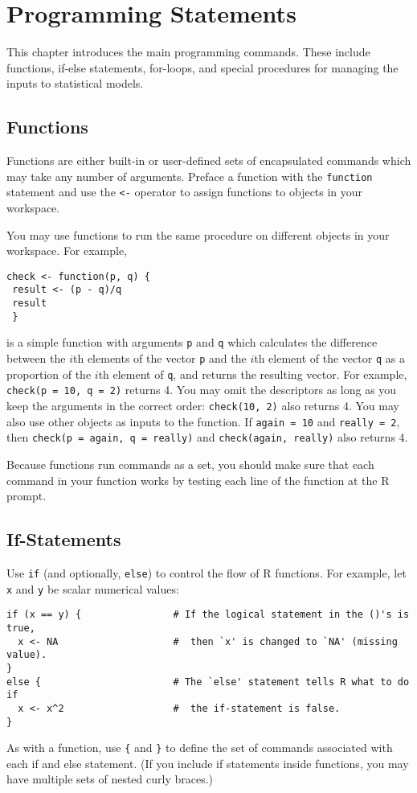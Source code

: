 \chapter{Programming Statements}

This chapter introduces the main programming commands.  These include
functions, if-else statements, for-loops, and special procedures for
managing the inputs to statistical models.  

\section{Functions}

Functions are either built-in or user-defined sets of encapsulated
commands which may take any number of arguments.  Preface a function
with the {\tt function} statement and use the {\tt <-}
operator to assign functions to objects in your workspace.  

You may use functions to run the same procedure on different objects
in your workspace.  For example, 
\begin{verbatim}
check <- function(p, q) { 
 result <- (p - q)/q
 result
 }
\end{verbatim}
is a simple function with arguments {\tt p} and {\tt q} which
calculates the difference between the $i$th elements of the vector
{\tt p} and the $i$th element of the vector {\tt q} as a proportion of
the $i$th element of {\tt q}, and returns the resulting vector.  For
example, {\tt check(p = 10, q = 2)} returns 4.  You may omit the
descriptors as long as you keep the arguments in the correct order:
{\tt check(10, 2)} also returns 4.  You may also use other objects as
inputs to the function.  If {\tt again = 10} and {\tt really = 2},
then {\tt check(p = again, q = really)} and {\tt check(again, really)}
also returns 4.

Because functions run commands as a set, you should make sure that
each command in your function works by testing each line of the
function at the R prompt.

\section{If-Statements}

Use {\tt if} (and optionally, {\tt else}) to control the flow of R
functions.  For example, let {\tt x} and {\tt y} be scalar numerical
values:  
\begin{verbatim}
if (x == y) {                # If the logical statement in the ()'s is true,  
  x <- NA                    #  then `x' is changed to `NA' (missing value). 
}
else {                       # The `else' statement tells R what to do if  
  x <- x^2                   #  the if-statement is false.  
} 
\end{verbatim}
As with a function, use {\tt \{} and {\tt \}} to define the set of commands associated
with each if and else statement.  (If you include if
statements inside functions, you may have multiple sets of nested
curly braces.)

